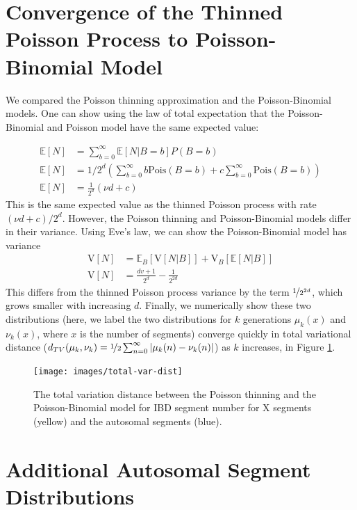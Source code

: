 \documentclass[9pt,twocolumn,twoside]{gsajnl}
\newcommand{\E}{\mathbb{E}}
\newcommand{\V}{\text{V}}
\begin{document}
\newpage
\appendix

\section*{Convergence of the Thinned Poisson Process to Poisson-Binomial Model}
\label{ap:pois-thin}

We compared the Poisson thinning approximation and the Poisson-Binomial models.
One can show using the law of total expectation that the Poisson-Binomial and
Poisson model have the same expected value:

\begin{align}
  \E[N] &= \sum_{b=0}^\infty \E[N | B = b]P(B = b)\\ \nonumber
  \E[N] &= 1/2^d \left( \sum_{b=0}^\infty b \text{Pois}(B = b) + c \sum_{b=0}^\infty \text{Pois}(B = b) \right) \\ \nonumber
  \E[N] &= \frac{1}{2^d} (\nu d + c) 
\end{align}
%
This is the same expected value as the thinned Poisson process with rate $(\nu
d + c)/2^d$. However, the Poisson thinning and Poisson-Binomial models differ
in their variance. Using Eve's law, we can show the Poisson-Binomial model has
variance
%
\begin{align}
  \label{eq:n-variance}
  \V[N] &= \E_B[\V[N | B]] + \V_B[\E[N|B]]\\ \nonumber
  \V[N] &= \frac{dv + 1}{2^d} - \frac{1}{2^{2d}}
\end{align}
%
This differs from the thinned Poisson process variance by the term
$\nicefrac{1}{2^{2d}}$, which grows smaller with increasing $d$. Finally, we
numerically show these two distributions (here, we label the two distributions
for $k$ generations $\mu_k(x)$ and $\nu_k(x)$, where $x$ is the number of
segments) converge quickly in total variational distance ($d_{TV}(\mu_k, \nu_k) =
\nicefrac{1}{2}\sum_{n = 0}^\infty | \mu_k(n) - \nu_k(n) |$) as $k$ increases,
in Figure \ref{fig:total-var-dist}.

\begin{figure}[!ht]
  \centering
  \texttt{[image: images/total-var-dist]}

  \caption{The total variation distance between the Poisson thinning and the Poisson-Binomial model for IBD segment number for X segments (yellow) and the autosomal segments (blue).}

\label{fig:total-var-dist}
\end{figure}

\section*{Additional Autosomal Segment Distributions}
\label{ap:auto-cousin}
\end{document}
